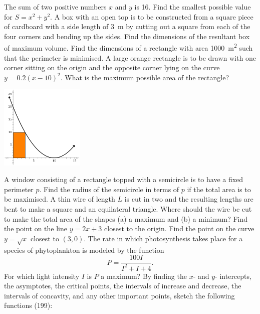 \begin{questions}
  \questioM The sum of two positive numbers $ x $ and $ y $ is 16. Find the smallest possible value for $ S = x^2 + y^2 $.
  \questioM A box with an open top is to be constructed from a square piece of cardboard with a side length of \SI{3}{\metre}
            by cutting out a square from each of the four corners and bending up the sides. Find the dimensions of the resultant
            box of maximum volume.
  \questioM Find the dimensions of a rectangle with area \SI{1000}{\metre\squared} such that the perimeter is minimised.
  \questioE A large orange rectangle is to be drawn with one corner sitting on the origin and the opposite corner lying on
            the curve $ y = 0.2(x - 10)^2 $. What is the maximum possible area of the rectangle?
            \begin{center}
              \includegraphics[width=0.3\textwidth]{paramax}
            \end{center}
  \questioM A window consisting of a rectangle topped with a semicircle is to have a fixed perimeter $ p $. Find the radius
            of the semicircle in terms of $ p $ if the total area is to be maximised.
  \questioE A thin wire of length $ L $ is cut in two and the resulting lengths are bent to make a square and an equilateral triangle. Where
            should the wire be cut to make the total area of the shapes (a) a maximum and (b) a minimum?
  \questioE Find the point on the line $ y = 2x + 3 $ closest to the origin.
  \questioE Find the point on the curve $ y = \sqrt{x} $ closest to $ (3, 0) $.
  \questioM The rate in which photosynthesis takes place for a species of phytoplankton is modeled by the function
            \begin{displaymath}
              P = \frac{100I}{I^2 + I + 4}.
            \end{displaymath}
            For which light intensity $ I $ is $ P $ a maximum?
  \questioE By finding the $ x$- and $ y$- intercepts, the asymptotes, the critical points, the
            intervals of increase and decrease, the intervals of concavity, and any other important
            points, sketch the following functions (199):
    \begin{parts}

\end{parts}
\end{questions}
